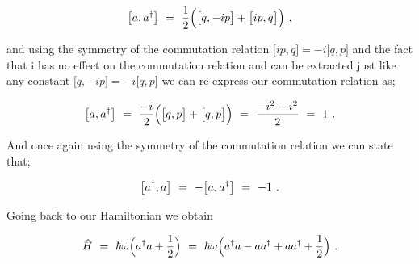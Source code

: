 \documentclass{article}
\begin{document}
\begin{equation} \label{eq:256}
\big[ a , a^{\dagger} \big] \hspace{0.125cm} = \hspace{0.125cm} \frac{1}{2} \Big( \big[ q , - i p \big] + \big[ i p , q \big] \Big)  \hspace{0.125cm} ,
\end{equation}

and using the symmetry of the commutation relation \begin{math} \big[ i p , q \big] = -i \big[ q , p \big] \end{math} and the fact that i has no effect on the commutation relation and can be extracted just like any constant \begin{math} \big[ q , - i p \big] = -i \big[ q , p \big] \end{math} we can re-express our commutation relation as; 

\begin{equation} \label{eq:256}
\big[ a , a^{\dagger} \big] \hspace{0.125cm} = \hspace{0.125cm} \frac{- i}{2} \Big( \big[ q , p \big] + \big[ q , p \big] \Big) \hspace{0.125cm} = \hspace{0.125cm} \frac{- i^2 - i^2}{2}\hspace{0.125cm} = \hspace{0.125cm} 1 \hspace{0.125cm} .
\end{equation}

And once again using the symmetry of the commutation relation we can state that;

\begin{equation} \label{eq:256}
\big[ a^{\dagger} , a \big] \hspace{0.125cm} = \hspace{0.125cm} - \big[ a , a^{\dagger} \big] \hspace{0.125cm} = \hspace{0.125cm} -1 \hspace{0.125cm} .
\end{equation}

Going back to our Hamiltonian we obtain

\begin{equation} \label{eq:256}
\hat{H} \hspace{0.125cm} = \hspace{0.125cm} \hbar \omega \Big( a^{\dagger} a + \frac{1}{2} \Big) \hspace{0.125cm} = \hspace{0.125cm} \hbar \omega \Big( a^{\dagger} a -  a a^{\dagger} + a a^{\dagger} +\frac{1}{2} \Big) \hspace{0.125cm} .
\end{equation}
\end{document}
